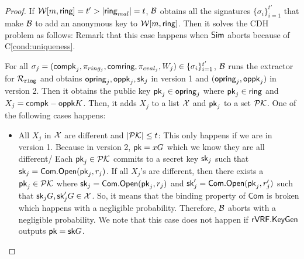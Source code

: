 \begin{proof}
	If $ \mathcal{W}[m,\mathsf{ring}] =t' > |\mathsf{ring}_{mal}| =t$, $ \mathcal{B} $ obtains all the signatures $ \{\sigma_i\}_{i =1}^{t'} $ that make $ \mathcal{B} $ to add an anonymous key to $ \mathcal{W}[m,\mathsf{ring}] $. Then it solves the CDH problem as follows: Remark that this case happens when $ \mathsf{Sim} $ aborts because of C\ref{cond:uniqueness}.
	
	For all $ \sigma_j =(\mathsf{compk}_j,\pi_{ring_j},\mathsf{comring}, \pi_{eval_j},W_j) \in \{\sigma_i\}_{i =1}^{t'} $, $ \mathcal{B} $ runs the extractor for $ \mathcal{R}_{\mathtt{ring}} $ and obtains $\mathsf{opring}_j, \mathsf{oppk}_j, \mathsf{sk}_j$ in version 1 and $ (\mathsf{opring}_j, \mathsf{oppk}_j) $ in version 2. Then it obtains the public key $ \mathsf{pk}_j \in \mathsf{opring}_j$ where $ \mathsf{pk}_j \in \mathsf{ring} $ and  $ X_j = \mathsf{compk}- \mathsf{oppk} K $.%
	Then, it adds $ X_j $ to a list $ {\mathcal{X}}  $ and $ \mathsf{pk}_j $ to a set $ {\mathcal{PK}} $. One of the following cases happens:
	
	\begin{itemize}
		
		\item All $ X_j $ in $ {\mathcal{X}} $ are different  and $ |{\mathcal{PK}}| \leq t $:  This only happens if we are in version 1. Because in version 2, $ \mathsf{pk} = x G $ which we know they are all different/ Each $ \mathsf{pk}_j \in {\ensuremath{\mathcal{PK}}} $ commits to a secret key $ \mathsf{sk}_j $ such that $ \mathsf{sk}_j = \mathsf{Com}.\mathsf{Open}(\mathsf{pk}_j, r_j) $. If all $ X_j $'s are different, then there exists a $ \mathsf{pk}_j \in {\ensuremath{\mathcal{PK}}} $ where $ \mathsf{sk}_j = \mathsf{Com}.\mathsf{Open}(\mathsf{pk}_j, r_j) $ and $ \mathsf{sk}'_j = \mathsf{Com}.\mathsf{Open}(\mathsf{pk}_j, r'_j) $ such that $ \mathsf{sk}_j G, \mathsf{sk}_j'G \in {\ensuremath{\mathcal{X}}} $. So, it  means that the binding property of $ \mathsf{Com} $ is broken which happens with a negligible probability. Therefore, $ \mathcal{B}  $ aborts with a negligible probability. We note that this case does not happen if $ {\mathsf{rVRF}}.{\mathsf{KeyGen}} $  outputs $ \mathsf{pk} = \mathsf{sk} G $. 
		

\end{itemize}
\end{proof}
